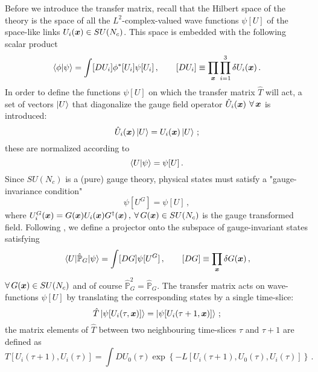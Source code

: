 \documentclass{article}
\begin{document}
Before we introduce the transfer matrix, recall that the Hilbert space of the theory is the space of all the $L^2$-complex-valued wave functions $\psi[U]$ of the space-like links $U_i(\vb*{x}) \in SU(N_c)$\cite{Della_Morte_2009}. This space is embedded with the following scalar product
\begin{equation}\label{eq: scalar product}
    \braket{\phi}{\psi} = \int [D U_i] \phi^* [U_i] \psi[U_i] \, , \qquad [D U_i] \equiv \prod_{\vb*{x}} \prod_{i=1}^3 \delta U_i(\vb*{x}) \, .
\end{equation}
In order to define the functions $\psi[U]$ on which the transfer matrix $\hat{T}$ will act, a set of vectors $\ket{U}$ that diagonalize the gauge field operator $\hat{U}_i(\vb*{x})$ $\forall \, \vb*{x}$ is introduced:
\begin{equation}
    \hat{U}_i(\vb*{x}) \ket{U} = U_i(\vb*{x}) \ket{U} \, ;
\end{equation}
these are normalized according to
\begin{equation}
    \braket{U}{\psi} = \psi[U] \, .
\end{equation}
Since $SU(N_c)$ is a (pure) gauge theory, physical states must satisfy a "gauge-invariance condition"
\begin{equation}
    \psi[U^G] = \psi[U] \, , 
\end{equation}
where $U_i^G(\vb*{x}) = G(\vb*{x}) U_i(\vb*{x}) G^\dag(\vb*{x})\, ,$ $\forall \, G(\vb*{x}) \in SU(N_c)$ is the gauge transformed field. Following \cite{Della_Morte_2009}, we define a projector onto the subspace of gauge-invariant states satisfying
\begin{equation}
    \mel{U}{\hat{\mathbb{P}}_G}{\psi} = \int [D G] \psi[U^G] \, , \qquad [D G] \equiv \prod_{\vb*{x}} \delta G(\vb*{x}) \, ,
\end{equation}
$\forall \, G(\vb*{x}) \in SU(N_c)$ and of course $\hat{\mathbb{P}}^2_G = \hat{\mathbb{P}}_G$. The transfer matrix acts on wave-functions $\psi[U]$ by translating the corresponding states by a single time-slice:
\begin{equation}
    \hat{T} \ket{\psi[U_i(\tau, \vb*{x})]} = \ket{\psi[U_i(\tau+1,\vb*{x})]} \, ;
\end{equation}
the matrix elements of $\hat{T}$ between two neighbouring time-slices $\tau$ and $\tau+1$ are defined as
\begin{equation}\label{eq: T mel}
    T[U_i(\tau+1), U_i(\tau)] = \int DU_0(\tau) \exp \! \left\{ -L[U_i(\tau+1), U_0(\tau), U_i(\tau)] \right\} \, .
\end{equation}
\end{document}
